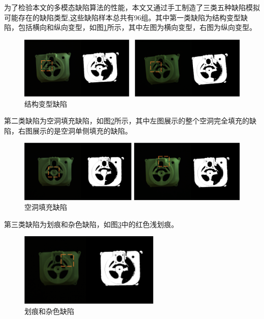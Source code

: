 为了检验本文的多模态缺陷算法的性能，本文又通过手工制造了三类五种缺陷模拟可能存在的缺陷类型,这些缺陷样本总共有96组。其中第一类缺陷为结构变型缺陷，包括横向和纵向变型，如图\ref{fig:bad-1}所示，其中左图为横向变型，右图为纵向变型。
\begin{figure}[htbp]
    \centering
    \includegraphics[width=1\textwidth]{figures/4/bad-1.png}
    \caption{结构变型缺陷}
    \label{fig:bad-1}
\end{figure}

第二类缺陷为空洞填充缺陷，如图\ref{fig:bad-2}所示，其中左图展示的整个空洞完全填充的缺陷，右图展示的是空洞单侧填充的缺陷。
\begin{figure}[htbp]
    \centering
    \includegraphics[width=1\textwidth]{figures/4/bad-2.png}
    \caption{空洞填充缺陷}
    \label{fig:bad-2}
\end{figure}

第三类缺陷为划痕和杂色缺陷，如图\ref{fig:bad-3}中的红色浅划痕。
\begin{figure}[htbp]
    \centering
    \includegraphics[width=0.6\textwidth]{figures/4/bad-3.png}
    \caption{划痕和杂色缺陷}
    \label{fig:bad-3}
\end{figure}

